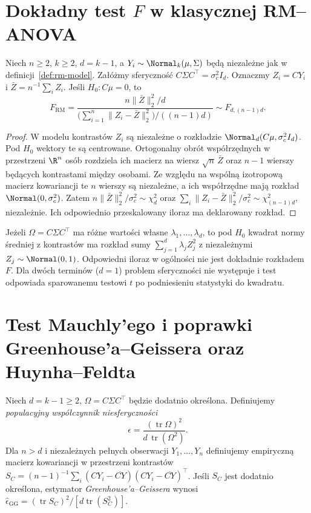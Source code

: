 \section{Dokładny test \texorpdfstring{$F$}{F} w klasycznej RM--ANOVA}
\begin{twierdzenie}\label{thm:rm-F}
Niech $n\ge2$, $k\ge2$, $d=k-1$, a $Y_i\sim\Normal_k(\mu,\Sigma)$ będą niezależne jak w definicji~\ref{def:rm-model}. Załóżmy sferyczność $C\Sigma C^\top=\sigma_c^2 I_d$. Oznaczmy $Z_i=CY_i$ i $\bar Z=n^{-1}\sum_i Z_i$. Jeśli $H_0:C\mu=0$, to
\[
 F_{\mathrm{RM}}=
 \frac{n\|\bar Z\|_2^2/d}{\bigl(\sum_{i=1}^n\|Z_i-\bar Z\|_2^2\bigr)/((n-1)d)}
 \sim F_{d,(n-1)d}.
\]
\end{twierdzenie}
\begin{proof}
W modelu kontrastów $Z_i$ są niezależne o rozkładzie $\Normal_d(C\mu,\sigma_c^2 I_d)$. Pod $H_0$ wektory te są centrowane. Ortogonalny obrót współrzędnych w przestrzeni $\R^n$ osób rozdziela ich macierz na wiersz $\sqrt n\,\bar Z$ oraz $n-1$ wierszy będących kontrastami między osobami. Ze względu na wspólną izotropową macierz kowariancji te $n$ wierszy są niezależne, a ich współrzędne mają rozkład $\Normal(0,\sigma_c^2)$. Zatem $n\|\bar Z\|_2^2/\sigma_c^2\sim\chi_d^2$ oraz $\sum_i\|Z_i-\bar Z\|_2^2/\sigma_c^2\sim\chi_{(n-1)d}^2$, niezależnie. Ich odpowiednio przeskalowany iloraz ma deklarowany rozkład.
\end{proof}

\begin{uwaga}
Jeżeli $\Omega=C\Sigma C^\top$ ma różne wartości własne $\lambda_1,\ldots,\lambda_d$, to pod $H_0$ kwadrat normy średniej z kontrastów ma rozkład sumy $\sum_{j=1}^d\lambda_j Z_j^2$ z niezależnymi $Z_j\sim\Normal(0,1)$. Odpowiedni iloraz w ogólności nie jest dokładnie rozkładem $F$. Dla dwóch terminów ($d=1$) problem sferyczności nie występuje i test odpowiada sparowanemu testowi $t$ po podniesieniu statystyki do kwadratu.
\end{uwaga}

\section{Test Mauchly'ego i poprawki Greenhouse'a--Geissera oraz Huynha--Feldta}
\begin{definicja}\label{def:gg-epsilon}
Niech $d=k-1\ge2$, $\Omega=C\Sigma C^\top$ będzie dodatnio określona. Definiujemy \emph{populacyjny współczynnik niesferyczności}
\[
 \epsilon=\frac{(\operatorname{tr}\Omega)^2}{d\,\operatorname{tr}(\Omega^2)}.
\]
Dla $n>d$ i niezależnych pełnych obserwacji $Y_1,\ldots,Y_n$ definiujemy empiryczną macierz kowariancji w przestrzeni kontrastów
$S_C=(n-1)^{-1}\sum_i (CY_i-\overline{CY})(CY_i-\overline{CY})^\top$.
Jeśli $S_C$ jest dodatnio określona, estymator \emph{Greenhouse'a--Geissera} wynosi $\widehat\epsilon_{\mathrm{GG}}=(\operatorname{tr}S_C)^2/[d\operatorname{tr}(S_C^2)]$.
\end{definicja}

